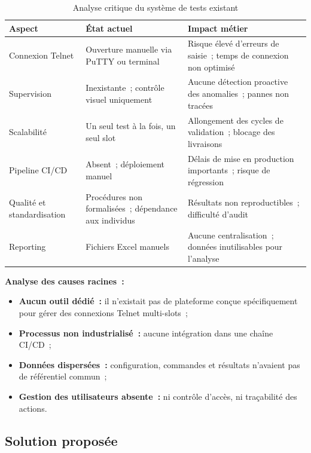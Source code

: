 \begin{table}[H]
  \centering
  \caption{Analyse critique du système de tests existant}
  \label{tab:analyse_critique}
  \begin{tabularx}{\textwidth}{|L{3cm}|L{4.5cm}|X|}
    \hline
    \textbf{Aspect} & \textbf{État actuel} & \textbf{Impact métier} \\
    \hline
    Connexion Telnet &
      Ouverture manuelle via PuTTY ou terminal &
      Risque élevé d'erreurs de saisie~; temps de connexion non optimisé \\
    \hline
    Supervision &
      Inexistante~; contrôle visuel uniquement &
      Aucune détection proactive des anomalies~; pannes non tracées \\
    \hline
    Scalabilité &
      Un seul test à la fois, un seul slot &
      Allongement des cycles de validation~; blocage des livraisons \\
    \hline
    Pipeline CI/CD &
      Absent~; déploiement manuel &
      Délais de mise en production importants~; risque de régression \\
    \hline
    Qualité et standardisation &
      Procédures non formalisées~; dépendance aux individus &
      Résultats non reproductibles~; difficulté d'audit \\
    \hline
    Reporting &
      Fichiers Excel manuels &
      Aucune centralisation~; données inutilisables pour l'analyse \\
    \hline
  \end{tabularx}
\end{table}

\noindent\textbf{Analyse des causes racines~:}
\begin{itemize}
  \item \textbf{Aucun outil dédié~:} il n'existait pas de plateforme
        conçue spécifiquement pour gérer des connexions Telnet multi-slots~;
  \item \textbf{Processus non industrialisé~:} aucune intégration dans
        une chaîne CI/CD~;
  \item \textbf{Données dispersées~:} configuration, commandes et résultats
        n'avaient pas de référentiel commun~;
  \item \textbf{Gestion des utilisateurs absente~:} ni contrôle d'accès,
        ni traçabilité des actions.
\end{itemize}

\subsection{Solution proposée}


